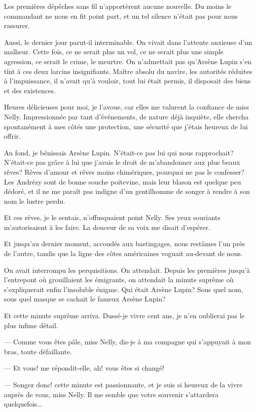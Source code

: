 \documentclass[12pt,a4paper]{article}
\begin{document}
Les premières dépêches sans fil n’apportèrent aucune nouvelle. Du moins le commandant ne nous en fit point part, et un tel silence n’était pas pour nous rassurer.

Aussi, le dernier jour parut-il interminable. On vivait dans l’attente anxieuse d’un malheur. Cette fois, ce ne serait plus un vol, ce ne serait plus une simple agression, ce serait le crime, le meurtre. On n’admettait pas qu’Arsène Lupin s’en tînt à ces deux larcins insignifiants. Maître absolu du navire, les autorités réduites à l’impuissance, il n’avait qu’à vouloir, tout lui était permis, il disposait des biens et des existences.

Heures délicieuses pour moi, je l’avoue, car elles me valurent la confiance de miss Nelly. Impressionnée par tant d’événements, de nature déjà inquiète, elle chercha spontanément à mes côtés une protection, une sécurité que j’étais heureux de lui offrir.

Au fond, je bénissais Arsène Lupin. N’était-ce pas lui qui nous rapprochait? N’était-ce pas grâce à lui que j’avais le droit de m’abandonner aux plus beaux rêves? Rêves d’amour et rêves moins chimériques, pourquoi ne pas le confesser? Les Andrézy sont de bonne souche poitevine, mais leur blason est quelque peu dédoré, et il ne me paraît pas indigne d’un gentilhomme de songer à rendre à son nom le lustre perdu.

Et ces rêves, je le sentais, n’offusquaient point Nelly. Ses yeux souriants m’autorisaient à les faire. La douceur de sa voix me disait d’espérer.

Et jusqu’au dernier moment, accoudés aux bastingages, nous restâmes l’un près de l’autre, tandis que la ligne des côtes américaines voguait au-devant de nous.

On avait interrompu les perquisitions. On attendait. Depuis les premières jusqu’à l’entrepont où grouillaient les émigrants, on attendait la minute suprême où s’expliquerait enfin l’insoluble énigme. Qui était Arsène Lupin? Sous quel nom, sous quel masque se cachait le fameux Arsène Lupin?

Et cette minute suprême arriva. Dussé-je vivre cent ans, je n’en oublierai pas le plus infime détail.

— Comme vous êtes pâle, miss Nelly, dis-je à ma compagne qui s’appuyait à mon bras, toute défaillante.

— Et vous! me répondit-elle, ah! vous êtes si changé!

— Songez donc! cette minute est passionnante, et je suis si heureux de la vivre auprès de vous, miss Nelly. Il me semble que votre souvenir s’attardera quelquefois…
\end{document}
